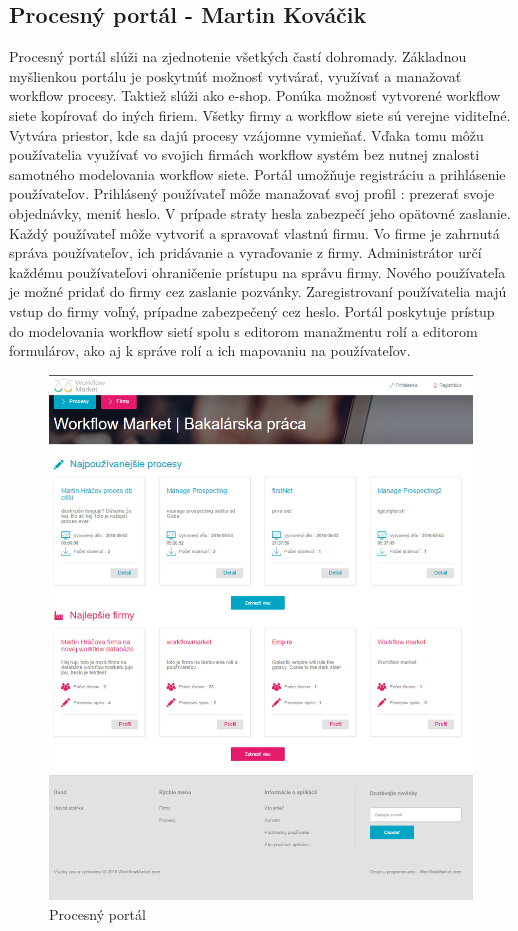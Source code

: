 \subsection{Procesný portál - Martin Kováčik}
Procesný portál slúži na zjednotenie všetkých častí dohromady. Základnou myšlienkou portálu je poskytnúť možnosť vytvárať, využívať a manažovať workflow procesy. Taktiež slúži ako e-shop. Ponúka možnosť vytvorené workflow siete kopírovať do iných firiem. Všetky firmy a workflow siete sú verejne viditeľné. Vytvára priestor, kde sa dajú procesy vzájomne vymieňať. Vďaka tomu môžu používatelia využívať vo svojich firmách workflow systém bez nutnej znalosti samotného modelovania workflow siete. Portál umožňuje registráciu a prihlásenie používateľov. Prihlásený používateľ  môže manažovať svoj profil : prezerať svoje objednávky, meniť heslo. V prípade straty hesla zabezpečí jeho opätovné zaslanie. Každý používateľ môže vytvoriť a spravovať vlastnú firmu. Vo firme je zahrnutá správa používateľov, ich pridávanie a vyraďovanie z firmy. Administrátor určí každému používateľovi ohraničenie prístupu na správu firmy. Nového používateľa je možné pridať do firmy cez zaslanie pozvánky. Zaregistrovaní používatelia majú vstup do firmy voľný, prípadne zabezpečený cez heslo. Portál poskytuje prístup do modelovania workflow sietí spolu s editorom manažmentu rolí a editorom formulárov, ako aj k správe rolí a ich mapovaniu na používateľov. 

\begin{figure}[h]
	\centering
	\includegraphics[width=0.7\linewidth]{images/martin}
	\caption{Procesný portál}
	\label{fig:procesný portál}
\end{figure}



